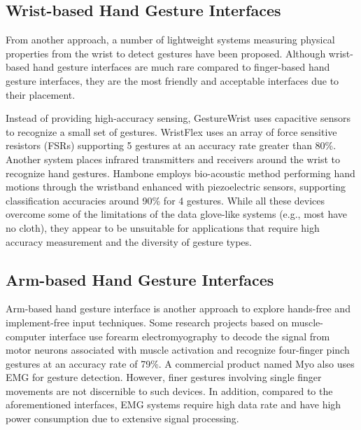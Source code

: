 \documentclass{sigchi}
\begin{document}
\subsection{Wrist-based Hand Gesture Interfaces}

From another approach, a number of lightweight systems measuring physical properties from the wrist to detect gestures have been proposed. 
Although wrist-based hand gesture interfaces are much rare compared to finger-based hand gesture interfaces, they are the most friendly and acceptable interfaces due to their placement.

Instead of providing high-accuracy sensing, GestureWrist \cite{Rekimoto:2001:GGU:580581.856565} uses capacitive sensors to recognize a small set of gestures. WristFlex \cite{Dementyev:2014:WLG:2642918.2647396} uses an array of force sensitive resistors (FSRs) supporting 5 gestures at an accuracy rate greater than 80\%. Another system \cite{Fukui:2011:HSC:2030112.2030154} places infrared transmitters and receivers around the wrist to recognize hand gestures. Hambone \cite{4373768} employs bio-acoustic method performing hand motions through the wristband enhanced with piezoelectric sensors, supporting classification accuracies around 90\% for 4 gestures. While all these devices overcome some of the limitations of the data glove-like systems (e.g., most have no cloth), they appear to be unsuitable for applications that require high accuracy measurement and the diversity of gesture types. 

\subsection{Arm-based Hand Gesture Interfaces}

Arm-based hand gesture interface is another approach to explore hands-free and implement-free input techniques. Some research projects based on muscle-computer interface \cite{Saponas:2009:EAI:1622176.1622208} use forearm electromyography to decode the signal from motor neurons associated with muscle activation and recognize four-finger pinch gestures at an accuracy rate of 79\%. A commercial product named Myo \cite{Myo} also uses EMG for gesture detection. However, finer gestures involving single finger movements are not discernible to such devices. In addition, compared to the aforementioned interfaces, EMG systems require high data rate and have high power consumption due to extensive signal processing. 

\end{document}
